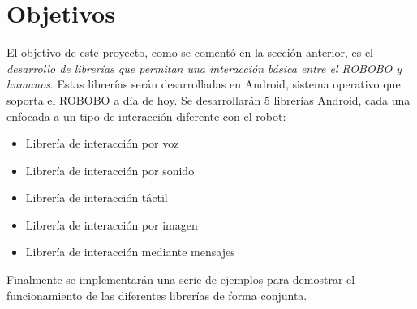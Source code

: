  \section{Objetivos}
 \label{sec:intro-objetives}
 El objetivo de este proyecto, como se comentó en la sección anterior, es el \textit{desarrollo de librerías que permitan una interacción básica entre el ROBOBO y humanos}. Estas librerías serán desarrolladas en Android, sistema operativo que soporta el ROBOBO a día de hoy. Se desarrollarán 5 librerías Android, cada una enfocada a un tipo de interacción diferente con el robot:
 \begin{itemize}
 	\item Librería de interacción por voz
 	\item Librería de interacción por sonido
 	\item Librería de interacción táctil
 	\item Librería de interacción por imagen
 	\item Librería de interacción mediante mensajes
 \end{itemize} 
 Finalmente se implementarán una serie de ejemplos para demostrar el funcionamiento de las diferentes librerías de forma conjunta.
